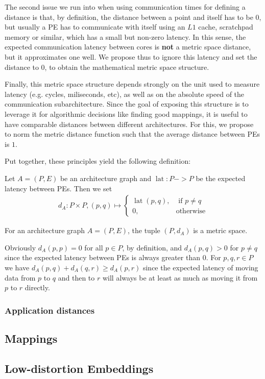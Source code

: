 The second issue we run into when using communication times for defining a distance is that, by definition, the distance between a point and itself has to be $0$, but usually a PE has to communicate with itself using an $L1$ cache, scratchpad memory or similar, which has a small but non-zero latency. In this sense, the expected communication latency between cores is \textbf{not} a metric space distance, but it approximates one well. We propose thus to ignore this latency and set the distance to 0, to obtain the mathematical metric space structure. 

Finally, this metric space structure depends strongly on the unit used to measure latency (e.g. cycles, miliseconds, etc), as well as on the absolute speed of the communication subarchitecture.
Since the goal of exposing this structure is to leverage it for algorithmic decisions like finding good mappings, it is useful to have comparable distances between different architectures.
For this, we propose to norm the metric distance function such that the average distance between PEs is $1$.

Put together, these principles yield the following definition:
\begin{defn}
Let $A = (P,E)$ be an architecture graph and $\operatorname{lat} : P -> P$ be the expected latency between PEs.
Then we set
\begin{align}
  d_A : P \times P, (p,q) \mapsto \left\{
      \begin{array}{rr}
        \operatorname{lat}(p,q), & \text{ if } p \neq q \\
        0, & \text{otherwise}
      \end{array} \right.
      \end{align}
\end{defn}
\begin{rem}
For an architecture graph $A = (P,E)$, the tuple $(P,d_A)$ is a metric space.
\begin{bew}
Obviously $d_A(p,p) = 0$ for all $p \in P$, by definition, and $d_A(p,q) > 0$ for $p \neq q$ since the expected latency between PEs is always greater than 0.
For $p,q,r \in P$ we have $d_A(p,q) + d_A(q,r) \geq d_A(p,r)$ since the expected latency of moving data from $p$ to $q$ and then to $r$ will always be at least as much as moving it from $p$ to $r$ directly.
\end{bew}
\end{rem}

\subsubsection{Application distances}

\subsection{Mappings}
\Blindtext[5]

\subsection{Low-distortion Embeddings}
\Blindtext[5] %

